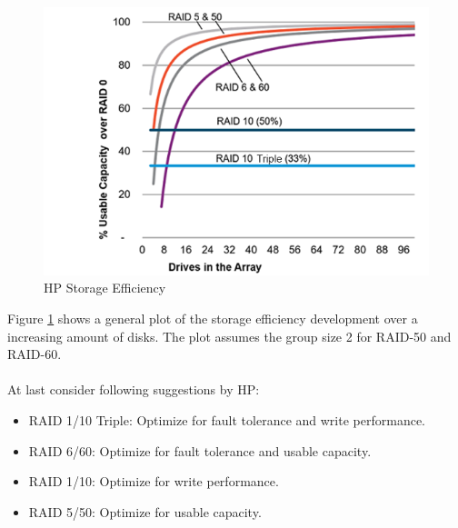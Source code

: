 \documentclass{article}
\begin{document}
\\ \\
\begin{figure}
    \label{fig:hp-storage-efficiency}
    \includegraphics[width=\textwidth]{hp-storage-efficiency}
    \caption{HP Storage Efficiency \cite{hpe:sa-userguide}}
\end{figure}
Figure \ref{fig:hp-storage-efficiency} shows a general plot of the storage efficiency development
over a increasing amount of disks. The plot assumes the group size 2 for RAID-50 and RAID-60. \cite{hpe:sa-userguide}
\\ \\
At last consider following suggestions by HP:
\begin{itemize}
    \item RAID 1/10 Triple: Optimize for fault tolerance and write performance.
    \item RAID 6/60: Optimize for fault tolerance and usable capacity.
    \item RAID 1/10: Optimize for write performance.
    \item RAID 5/50: Optimize for usable capacity.
\end{itemize}
\end{document}
